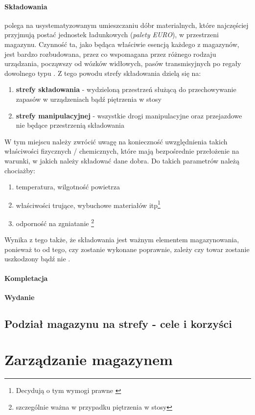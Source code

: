 		\paragraph{Składowania} polega na usystematyzowanym umieszczaniu dóbr materialnych, które najczęściej przyjmują
		postać jednostek ładunkowych (\textit{palety EURO}), w przestrzeni magazynu. Czynność ta, jako będąca właściwie
		esencją każdego z magazynów, jest bardzo rozbudowana, przez co wspomagana przez różnego rodzaju urządzania, począwszy
		od wózków widłowych, pasów transmisyjnych po regały dowolnego typu . Z tego powodu strefy składowania dzielą się na:
		\begin{enumerate}
			\item \textbf{strefy składowania} - wydzieloną przestrzeń służącą do 
			przechowywanie zapasów w urządzeniach bądź piętrzenia w stosy
			\item \textbf{strefy manipulacyjnej} - wszystkie drogi manipulacyjne 
			oraz przejazdowe nie będące przestrzenią składowania
		\end{enumerate}	
		W tym miejscu należy zwrócić uwagę na konieczność uwzględnienia takich właściwości fizycznych / chemicznych, które
		mają bezpośrednie przełożenie na warunki, w jakich należy składować dane dobra. Do takich parametrów należą
		chociażby:
		\begin{enumerate}
			\item temperatura, wilgotność powietrza
			\item właściwości trujące, wybuchowe materiałów itp\footnote{Decydują o tym wymogi prawne \cite{ustawa_flamableMaterials}}
			\item odporność na zgniatanie \footnote{szczególnie ważna w przypadku piętrzenia w stosy}
		\end{enumerate}			
		Wynika z tego także, że składowania jest ważnym elementem magazynowania, ponieważ to od tego, czy zostanie
		wykonane poprawnie, zależy czy towar zostanie uszkodzony bądź nie \cite{EWSS}.
	\paragraph{Kompletacja}
	\paragraph{Wydanie}
	
	\subsection{Podział magazynu na strefy - cele i korzyści}
	
\section{Zarządzanie magazynem}
